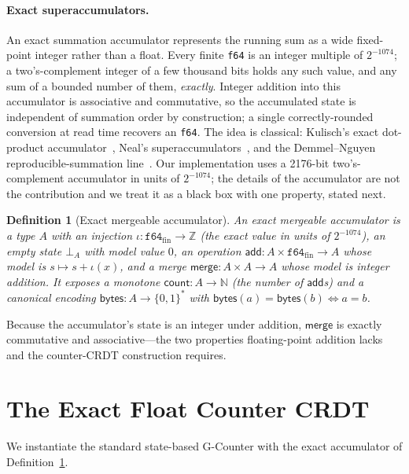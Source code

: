 \documentclass[11pt]{article}
\newtheorem{definition}[theorem]{Definition}
\begin{document}
\paragraph{Exact superaccumulators.} An exact summation accumulator represents the running sum as a
wide fixed-point integer rather than a float. Every finite \texttt{f64} is an integer multiple of
$2^{-1074}$; a two's-complement integer of a few thousand bits holds any such value, and any sum of a
bounded number of them, \emph{exactly}. Integer addition into this accumulator is associative and
commutative, so the accumulated state is independent of summation order by construction; a single
correctly-rounded conversion at read time recovers an \texttt{f64}. The idea is classical: Kulisch's
exact dot-product accumulator~\cite{kulisch}, Neal's superaccumulators~\cite{neal}, and the
Demmel--Nguyen reproducible-summation line~\cite{demmel}. Our implementation uses a 2176-bit
two's-complement accumulator in units of $2^{-1074}$; the details of the accumulator are not the
contribution and we treat it as a black box with one property, stated next.

\begin{definition}[Exact mergeable accumulator]\label{def:acc}
An \emph{exact mergeable accumulator} is a type $A$ with an injection $\iota : \texttt{f64}_{\mathrm{fin}}
\to \mathbb{Z}$ (the exact value in units of $2^{-1074}$), an empty state $\bot_A$ with model value $0$,
an operation $\mathsf{add} : A \times \texttt{f64}_{\mathrm{fin}} \to A$ whose model is $s \mapsto s +
\iota(x)$, and a merge $\mathsf{merge} : A \times A \to A$ whose model is integer addition. It exposes a
monotone $\mathsf{count} : A \to \mathbb{N}$ (the number of $\mathsf{add}$s) and a canonical encoding
$\mathsf{bytes} : A \to \{0,1\}^{*}$ with $\mathsf{bytes}(a) = \mathsf{bytes}(b) \iff a = b$.
\end{definition}

Because the accumulator's state is an integer under addition, $\mathsf{merge}$ is exactly commutative
and associative---the two properties floating-point addition lacks and the counter-CRDT construction
requires.

\section{The Exact Float Counter CRDT}\label{sec:construction}

We instantiate the standard state-based G-Counter with the exact accumulator of
Definition~\ref{def:acc}.
\end{document}
